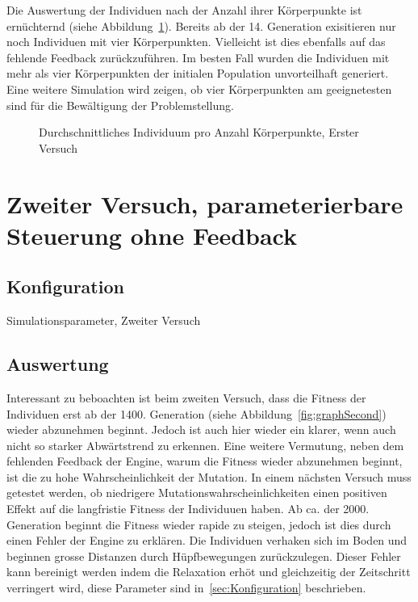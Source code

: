       Die Auswertung der Individuen nach der Anzahl ihrer Körperpunkte ist ernüchternd (siehe Abbildung~\ref{fig:graphBpFirst}).
      Bereits ab der 14. Generation exisitieren nur noch Individuen mit vier Körperpunkten.
      Vielleicht ist dies ebenfalls auf das fehlende Feedback zurückzuführen.
      Im besten Fall wurden die Individuen mit mehr als vier Körperpunkten der initialen Population unvorteilhaft generiert.
      Eine weitere Simulation wird zeigen,
      ob vier Körperpunkten am geeignetesten sind für die Bewältigung der Problemstellung.

      \begin{figure}
        
        \caption{Durchschnittliches Individuum pro Anzahl Körperpunkte, Erster Versuch\label{fig:graphBpFirst}}
      \end{figure}

  \section{Zweiter Versuch, parameterierbare Steuerung ohne Feedback}

    \subsection{Konfiguration}

      \begin{table}[H]
        
        \caption{Simulationsparameter, Zweiter Versuch}
      \end{table}

    \subsection{Auswertung}

      Interessant zu beboachten ist beim zweiten Versuch,
      dass die Fitness der Individuen erst ab der 1400\@. Generation (siehe Abbildung~\ref{fig:graphSecond})
      wieder abzunehmen beginnt.
      Jedoch ist auch hier wieder ein klarer, wenn auch nicht so starker Abwärtstrend zu erkennen.
      Eine weitere Vermutung, neben dem fehlenden Feedback der Engine, warum die Fitness wieder abzunehmen beginnt,
      ist die zu hohe Wahrscheinlichkeit der Mutation.
      In einem nächsten Versuch muss getestet werden,
      ob niedrigere Mutationswahrscheinlichkeiten einen positiven Effekt auf die langfristie Fitness der Individuuen haben.
      Ab ca\@. der 2000\@. Generation beginnt die Fitness wieder rapide zu steigen,
      jedoch ist dies durch einen Fehler der Engine zu erklären.
      Die Individuen verhaken sich im Boden und beginnen grosse Distanzen durch Hüpfbewegungen zurückzulegen.
      Dieser Fehler kann bereinigt werden indem die Relaxation erhöt und gleichzeitig der Zeitschritt verringert wird,
      diese Parameter sind in~\ref{sec:Konfiguration} beschrieben.

